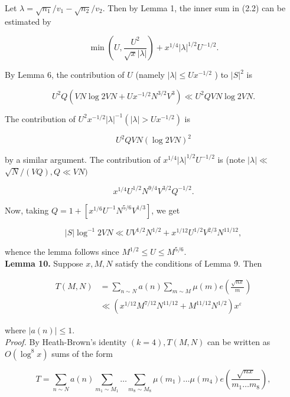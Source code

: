 \documentclass[10pt]{article}
\begin{document}
Let $\lambda=\sqrt{n_{1}} / v_{1}-\sqrt{n_{2}} / v_{2}$. Then by Lemma 1, the inner sum in (2.2) can be estimated by


\begin{equation*}
\min \left(U, \frac{U^{2}}{\sqrt{x}|\lambda|}\right)+x^{1 / 4}|\lambda|^{1 / 2} U^{-1 / 2} . \tag{2.4}
\end{equation*}


By Lemma 6, the contribution of $U$ (namely $|\lambda| \leq U x^{-1 / 2}$ ) to $|S|^{2}$ is


\begin{equation*}
U^{2} Q\left(V N \log 2 V N+U x^{-1 / 2} N^{3 / 2} V^{3}\right) \ll U^{2} Q V N \log 2 V N . \tag{2.5}
\end{equation*}


The contribution of $U^{2} x^{-1 / 2}|\lambda|^{-1}\left(|\lambda|>U x^{-1 / 2}\right)$ is

$$
U^{2} Q V N(\log 2 V N)^{2}
$$

by a similar argument. The contribution of $x^{1 / 4}|\lambda|^{1 / 2} U^{-1 / 2}$ is (note $|\lambda| \ll$ $\sqrt{N} /(V Q), Q \ll V N)$

$$
x^{1 / 4} U^{1 / 2} N^{9 / 4} V^{3 / 2} Q^{-1 / 2}.
$$

Now, taking $Q=1+\left[x^{1 / 6} U^{-1} N^{5 / 6} V^{1 / 3}\right]$, we get


\begin{equation*}
|S| \log ^{-1} 2 V N \ll U V^{1 / 2} N^{1 / 2}+x^{1 / 12} U^{1 / 2} V^{2 / 3} N^{11 / 12}, \tag{2.6}
\end{equation*}


whence the lemma follows since $M^{1 / 2} \leq U \leq M^{5 / 6}$.\\
\medskip\noindent\textbf{Lemma 10.} Suppose $x, M, N$ satisfy the conditions of Lemma 9. Then


\begin{align*}
T(M, N) & =\sum_{n \sim N} a(n) \sum_{m \sim M} \mu(m) e\left(\frac{\sqrt{n x}}{m}\right)  \tag{2.7}\\
& \ll\left(x^{1 / 12} M^{7 / 12} N^{11 / 12}+M^{11 / 12} N^{1 / 2}\right) x^{\varepsilon}
\end{align*}


where $|a(n)| \leq 1$.\\
\smallskip\noindent\textit{Proof.} By Heath-Brown's identity $(k=4), T(M, N)$ can be written as $O\left(\log ^{8} x\right)$ sums of the form


\begin{equation*}
T=\sum_{n \sim N} a(n) \sum_{m_{1} \sim M_{1}} \ldots \sum_{m_{8} \sim M_{8}} \mu\left(m_{1}\right) \ldots \mu\left(m_{4}\right) e\left(\frac{\sqrt{n x}}{m_{1} \ldots m_{8}}\right), \tag{2.8}
\end{equation*}
\end{document}

